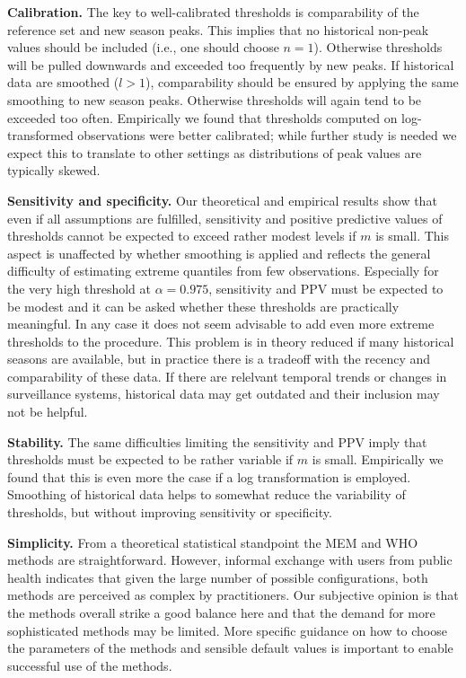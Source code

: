 \documentclass{article}
\begin{document}
\begin{description}
\item \textbf{Calibration.} The key to well-calibrated thresholds is comparability of the reference set and new season peaks. This implies that no historical non-peak values should be included (i.e., one should choose $n = 1$). Otherwise thresholds will be pulled downwards and exceeded too frequently by new peaks. If historical data are smoothed ($l > 1$), comparability should be ensured by applying the same smoothing to new season peaks. Otherwise thresholds will again tend to be exceeded too often. Empirically we found that thresholds computed on log-transformed observations were better calibrated; while further study is needed we expect this to translate to other settings as distributions of peak values are typically skewed.
\item \textbf{Sensitivity and specificity.} Our theoretical and empirical results show that even if all assumptions are fulfilled, sensitivity and positive predictive values of thresholds cannot be expected to exceed rather modest levels if $m$ is small. This aspect is unaffected by whether smoothing is applied and reflects the general difficulty of estimating extreme quantiles from few observations. Especially for the very high threshold at $\alpha = 0.975$, sensitivity and PPV must be expected to be modest and it can be asked whether these thresholds are practically meaningful. In any case it does not seem advisable to add even more extreme thresholds to the procedure. This problem is in theory reduced if many historical seasons are available, but in practice there is a tradeoff with the recency and comparability of these data. If there are relelvant temporal trends or changes in surveillance systems, historical data may get outdated and their inclusion may not be helpful.
\item \textbf{Stability.} The same difficulties limiting the sensitivity and PPV imply that thresholds must be expected to be rather variable if $m$ is small. Empirically we found that this is even more the case if a log transformation is employed. Smoothing of historical data helps to somewhat reduce the variability of thresholds, but without improving sensitivity or specificity.
\item \textbf{Simplicity.} From a theoretical statistical standpoint the MEM and WHO methods are straightforward. However, informal exchange with users from public health indicates that given the large number of possible configurations, both methods are perceived as complex by practitioners. Our subjective opinion is that the methods overall strike a good balance here and that the demand for more sophisticated methods may be limited. More specific guidance on how to choose the parameters of the methods and sensible default values is important to enable successful use of the methods.

\end{description}
\end{document}
